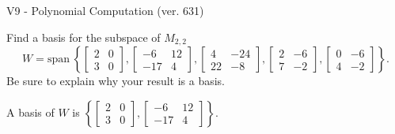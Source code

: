 \begin{exercise}
  \begin{exerciseTitle}V9 - Polynomial Computation (ver. 631)\end{exerciseTitle}
  \begin{exerciseStatement}
    Find a basis for the subspace of \(M_{2,2}\) 
\[W=\mathrm{span}\ \left\{\left[\begin{array}{cc}
2 & 0 \\
3 & 0
\end{array}\right] , \left[\begin{array}{cc}
-6 & 12 \\
-17 & 4
\end{array}\right] , \left[\begin{array}{cc}
4 & -24 \\
22 & -8
\end{array}\right] , \left[\begin{array}{cc}
2 & -6 \\
7 & -2
\end{array}\right] , \left[\begin{array}{cc}
0 & -6 \\
4 & -2
\end{array}\right]\right\}.\]
 Be sure to explain why your result is a basis.


  \end{exerciseStatement}
  \begin{exerciseAnswer}
   A basis of \(W\) is  \(\left\{\left[\begin{array}{cc}
2 & 0 \\
3 & 0
\end{array}\right] , \left[\begin{array}{cc}
-6 & 12 \\
-17 & 4
\end{array}\right]\right\}\).
  


  \end{exerciseAnswer}
\end{exercise}